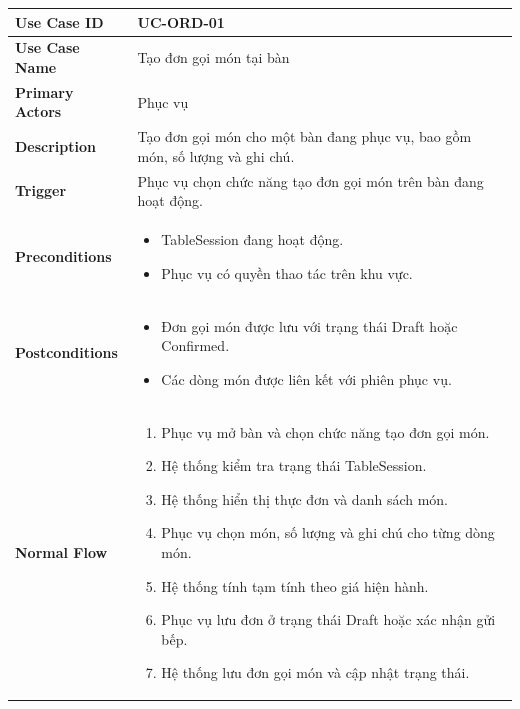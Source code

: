 \begin{longtable}{|p{4cm}|p{10cm}|}
\hline
\textbf{Use Case ID} & UC-ORD-01 \\ \hline
\textbf{Use Case Name} & Tạo đơn gọi món tại bàn \\ \hline
\textbf{Primary Actors} & Phục vụ \\ \hline

\textbf{Description} & Tạo đơn gọi món cho một bàn đang phục vụ, bao gồm món, số lượng và ghi chú. \\ \hline

\textbf{Trigger} & Phục vụ chọn chức năng tạo đơn gọi món trên bàn đang hoạt động. \\ \hline

\textbf{Preconditions} &
\begin{itemize}[leftmargin=*, noitemsep]
  \item \textsf{TableSession} đang hoạt động.
  \item Phục vụ có quyền thao tác trên khu vực.
\end{itemize} \\ \hline

\textbf{Postconditions} &
\begin{itemize}[leftmargin=*, noitemsep]
  \item Đơn gọi món được lưu với trạng thái \textsf{Draft} hoặc \textsf{Confirmed}.
  \item Các dòng món được liên kết với phiên phục vụ.
\end{itemize} \\ \hline

\textbf{Normal Flow} &
\begin{enumerate}[leftmargin=*, noitemsep]
  \item Phục vụ mở bàn và chọn chức năng tạo đơn gọi món.
  \item Hệ thống kiểm tra trạng thái \textsf{TableSession}.
  \item Hệ thống hiển thị thực đơn và danh sách món.
  \item Phục vụ chọn món, số lượng và ghi chú cho từng dòng món.
  \item Hệ thống tính tạm tính theo giá hiện hành.
  \item Phục vụ lưu đơn ở trạng thái \textsf{Draft} hoặc xác nhận gửi bếp.
  \item Hệ thống lưu đơn gọi món và cập nhật trạng thái.
\end{enumerate} \\ \hline


\end{longtable}
